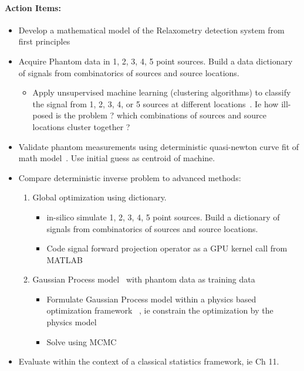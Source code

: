 \documentclass{article}         %
\theoremstyle{definition}
\theoremstyle{remark}
\begin{document}
\paragraph{Action Items:}  
\begin{itemize}
\item Develop a mathematical model of the Relaxometry detection system from 
first principles \cite{Flynn2005}
\item Acquire Phantom data in 1, 2, 3, 4, 5 point sources.  Build a data
dictionary of signals from combinatorics of sources and source locations. 
   \begin{itemize}
   \item Apply unsupervised machine learning (clustering algorithms) 
         to classify the signal from 1, 2, 3, 4, or 5 
         sources at different locations~\cite{Fraley2002,Sebastiani2003,Kapp2007,
         Shi2014,Criminisi2013,Murphy2012a,Bishop2006,Gelman2007}. 
         Ie how ill-posed is the problem ? which
         combinations of sources and source locations cluster together ? 
   \end{itemize}
\item Validate phantom measurements using deterministic quasi-newton curve fit of math 
      model~\cite{Fegan2010,Adolphi2010,Hathaway2011,Tessier2012,Adolphi2014,Schwindt2013,Shen2012,Hajdu2013,Paik2013,Amiri2011}. 
      Use initial guess as centroid of machine.
\item Compare deterministic inverse problem to advanced methods:
\begin{enumerate}
\item Global optimization using dictionary. 
   \begin{itemize}
   \item in-silico simulate 1, 2, 3, 4, 5 point sources. Build a dictionary of 
      signals from combinatorics of sources and source locations. 
   \item Code signal forward projection operator as a GPU kernel call from MATLAB
   \end{itemize}
\item Gaussian Process model~\cite{Rasmussen2006} with phantom data as training data
   \begin{itemize}
   \item Formulate Gaussian Process model within a physics based
         optimization framework~\cite{Constantinescu2013} , ie
         constrain the optimization by the physics model
   \item Solve using MCMC~\cite{Liu2002,Martin2012,kaipio2005statistical,Tan2012}
   \end{itemize}
\end{enumerate}
\item Evaluate within the context of a classical statistics framework, ie \cite{Rosner2010} Ch 11.
\end{itemize}
\end{document}
